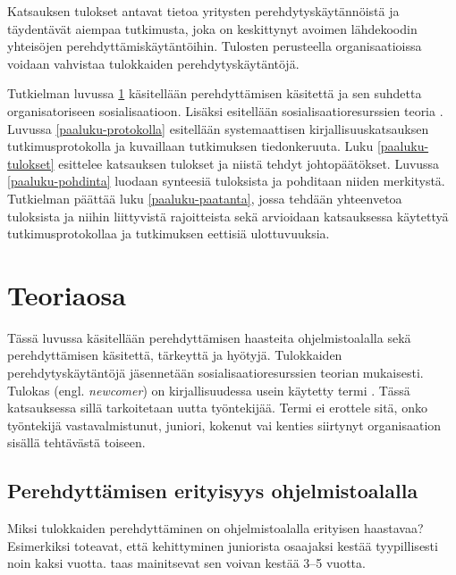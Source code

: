 \documentclass[utf8]{gradu3}
\begin{document}
Katsauksen tulokset antavat tietoa yritysten perehdytyskäytännöistä ja täydentävät aiempaa tutkimusta, joka on keskittynyt avoimen lähdekoodin yhteisöjen perehdyttämiskäytäntöihin. Tulosten perusteella organisaatioissa voidaan vahvistaa tulokkaiden perehdytyskäytäntöjä.

Tutkielman luvussa \ref{paaluku-teoria} käsitellään perehdyttämisen käsitettä ja sen suhdetta organisatoriseen sosialisaatioon. Lisäksi esitellään sosialisaatioresurssien teoria \parencite{saks-gruman-2012}. Luvussa \ref{paaluku-protokolla} esitellään systemaattisen kirjallisuuskatsauksen tutkimusprotokolla ja kuvaillaan tutkimuksen tiedonkeruuta. Luku \ref{paaluku-tulokset} esittelee katsauksen tulokset ja niistä tehdyt johtopäätökset. Luvussa \ref{paaluku-pohdinta} luodaan synteesiä tuloksista ja pohditaan niiden merkitystä. Tutkielman päättää luku \ref{paaluku-paatanta}, jossa tehdään yhteenvetoa tuloksista ja niihin liittyvistä rajoitteista sekä arvioidaan katsauksessa käytettyä tutkimusprotokollaa ja tutkimuksen eettisiä ulottuvuuksia.



\chapter{Teoriaosa}
\label{paaluku-teoria}

Tässä luvussa käsitellään perehdyttämisen haasteita ohjelmistoalalla sekä perehdyttämisen käsitettä, tärkeyttä ja hyötyjä. Tulokkaiden perehdytyskäytäntöjä jäsennetään sosialisaatioresurssien teorian \parencite{saks-gruman-2012} mukaisesti. Tulokas (engl. \textit{newcomer}) on kirjallisuudessa usein käytetty termi %
\parencites%
    [mm.][]{matturro-ym-2017}%
    {bauer-erdogan-2012}%
    {begel-simon-2008-all-over-again}%
    {steinmacher-ym-2015}%
    {britto-ym-2019}%
\relax.
%
Tässä katsauksessa sillä tarkoitetaan uutta työntekijää. Termi ei erottele sitä, onko työntekijä vastavalmistunut, juniori, kokenut vai kenties siirtynyt organisaation sisällä tehtävästä toiseen.

\section{Perehdyttämisen erityisyys ohjelmistoalalla}

Miksi tulokkaiden perehdyttäminen on ohjelmistoalalla erityisen haastavaa? Esimerkiksi \textcite{bologa-lupu-2014} toteavat, että kehittyminen juniorista osaajaksi kestää tyypillisesti noin kaksi vuotta. \textcite{britto-ym-2020} taas mainitsevat sen voivan kestää 3--5 vuotta.
\end{document}
